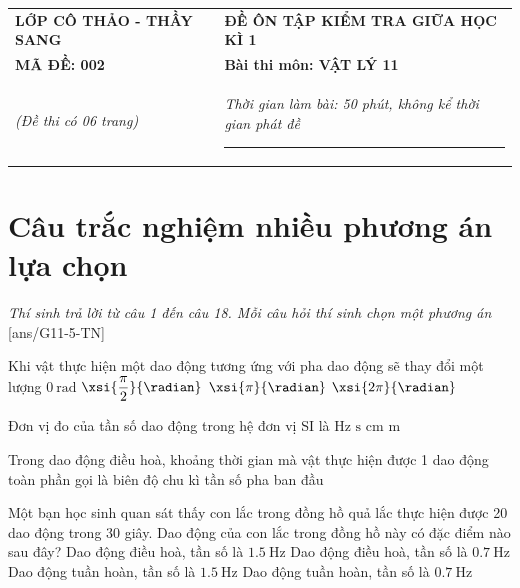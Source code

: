 \begin{center}
	\begin{tabular}{M{6.5cm}M{11cm}}
		\textbf{LỚP CÔ THẢO - THẦY SANG}& \textbf{ĐỀ ÔN TẬP KIỂM TRA GIỮA HỌC KÌ 1}\\
		\textbf{MÃ ĐỀ: 002}& \textbf{Bài thi môn: VẬT LÝ 11}\\
		\textit{(Đề thi có 06 trang)}& \textit{Thời gian làm bài: 50 phút, không kể thời gian phát đề}
		
		\noindent\rule{4cm}{0.8pt} \\
	\end{tabular}
\end{center}
\setcounter{section}{0}
\section{Câu trắc nghiệm nhiều phương án lựa chọn}
\textit{Thí sinh trả lời từ câu 1 đến câu 18. Mỗi câu hỏi thí sinh chọn một phương án}
\setcounter{ex}{0}
[ans/G11-5-TN]
\begin{ex}
	Khi vật thực hiện một dao động tương ứng với pha dao động sẽ thay đổi một lượng 
	\choice
	{$\SI{0}{\radian}$}
	{$\xsi{\dfrac{\pi}{2}}{\radian}$}
	{$\xsi{\pi}{\radian}$}
	{\True $\xsi{2\pi}{\radian}$}
	\loigiai{}
\end{ex}
\begin{ex}
	Đơn vị đo của tần số dao động trong hệ đơn vị SI là 
	\choice
	{\True $\si{\hertz}$}
	{$\si{\second}$}
	{$\si{\centi\meter}$}
	{$\si{\meter}$}
	\loigiai{}
\end{ex}
\begin{ex}
	Trong dao động điều hoà, khoảng thời gian mà vật thực hiện được 1 dao động toàn phần gọi là
	\choice
	{biên độ}
	{\True chu kì}
	{tần số}
	{pha ban đầu}
\end{ex}
\begin{ex}
	Một bạn học sinh quan sát thấy con lắc trong đồng hồ quả lắc thực hiện được 20 dao động trong 30 giây. Dao động của con lắc trong đồng hồ này có đặc điểm nào sau đây?
	\choice
	{Dao động điều hoà, tần số là $\SI{1.5}{\hertz}$}
	{Dao động điều hoà, tần số là $\SI{0.7}{\hertz}$}
	{Dao động tuần hoàn, tần số là $\SI{1.5}{\hertz}$}
	{\True Dao động tuần hoàn, tần số là $\SI{0.7}{\hertz}$}
\end{ex}
